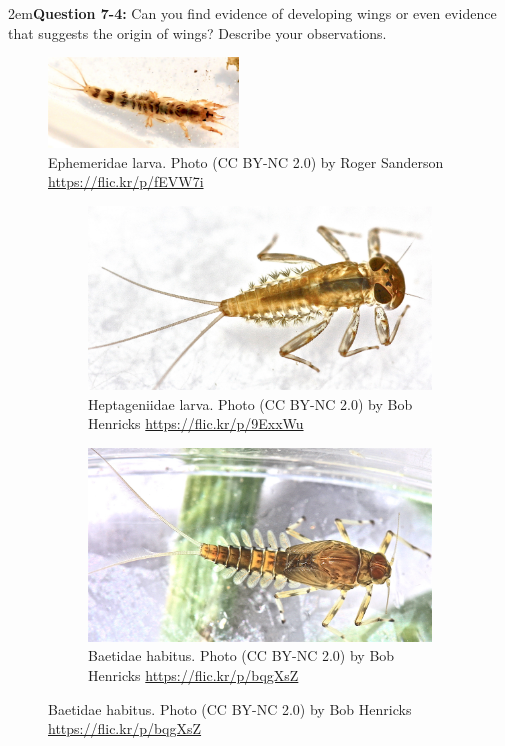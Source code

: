 \documentclass[letterpaper, 11pt]{article}
\begin{document}
\hangindent2em\textbf{Question 7-4:} Can you find evidence of developing wings or even evidence that suggests the origin of wings? Describe your observations.\\

\begin{figure}[ht!]
  \centering
    \includegraphics[width=0.45\textwidth]{EphemeridLarva}
  \caption{Ephemeridae larva. Photo (CC BY-NC 2.0) by Roger Sanderson \url{https://flic.kr/p/fEVW7i}}
  \label{fig:ephemeridlarva}
\end{figure}

\begin{figure}[ht!]
    \centering
    \begin{subfigure}[ht!]{0.47\textwidth}
        \includegraphics[width=\textwidth]{HeptageniidLarva}
        \caption{Heptageniidae larva. Photo (CC BY-NC 2.0) by Bob Henricks \url{https://flic.kr/p/9ExxWu}}
        \label{fig:heptageniidlarva}
    \end{subfigure}
    \hfill
    \begin{subfigure}[ht!]{0.46\textwidth}
        \includegraphics[width=\textwidth]{BaetidLarva}
        \caption{Baetidae habitus. Photo (CC BY-NC 2.0) by Bob Henricks \url{https://flic.kr/p/bqgXsZ}}
        \label{fig:baetidlarva}
    \end{subfigure}
    \label{fig:mayflylarvae}
\end{figure}
\FloatBarrier
\end{document}
